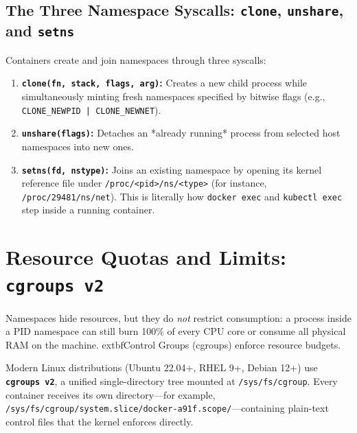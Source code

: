 \subsection{The Three Namespace Syscalls: \texttt{clone}, \texttt{unshare}, and \texttt{setns}}
Containers create and join namespaces through three syscalls:
\begin{enumerate}[leftmargin=15pt]
  \item \textbf{\texttt{clone(fn, stack, flags, arg)}:} Creates a new child process while simultaneously minting fresh namespaces specified by bitwise flags (e.g., \texttt{CLONE\_NEWPID | CLONE\_NEWNET}).
  \item \textbf{\texttt{unshare(flags)}:} Detaches an *already running* process from selected host namespaces into new ones.
  \item \textbf{\texttt{setns(fd, nstype)}:} Joins an existing namespace by opening its kernel reference file under \texttt{/proc/<pid>/ns/<type>} (for instance, \texttt{/proc/29481/ns/net}). This is literally how \texttt{docker exec} and \texttt{kubectl exec} step inside a running container.
\end{enumerate}

\section{Resource Quotas and Limits: \texttt{cgroups v2}}

Namespaces hide resources, but they do \emph{not} restrict consumption: a process inside a PID namespace can still burn 100\% of every CPU core or consume all physical RAM on the machine. 	extbf{Control Groups (cgroups)} enforce resource budgets.

Modern Linux distributions (Ubuntu 22.04+, RHEL 9+, Debian 12+) use \textbf{\texttt{cgroups v2}}, a unified single-directory tree mounted at \texttt{/sys/fs/cgroup}. Every container receives its own directory—for example, \texttt{/sys/fs/cgroup/system.slice/docker-a91f.scope/}—containing plain-text control files that the kernel enforces directly.

